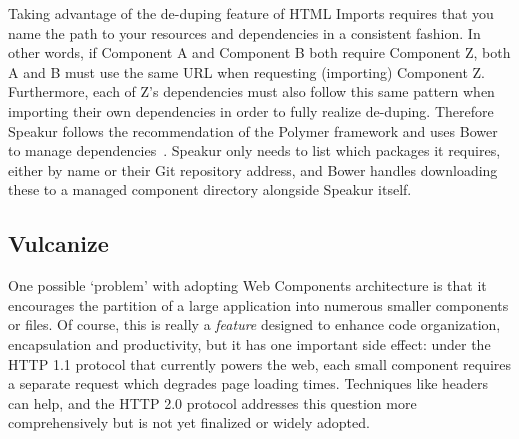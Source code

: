 Taking advantage of the de-duping feature of HTML Imports
requires that you name the path to your resources and dependencies in a consistent fashion.
In other words, if Component A and Component B both require Component Z, both A and B must use the same URL when requesting (importing) Component Z.
Furthermore, each of Z's dependencies must also follow this same pattern when importing their own dependencies in order to fully realize de-duping.
Therefore Speakur follows the recommendation of the Polymer framework and uses Bower to manage dependencies~\cite{bowercontributors2015}. 
Speakur only needs to list which packages it requires, either by name or their Git repository address, 
and Bower handles downloading these to a managed component directory alongside Speakur itself.

\subsection{Vulcanize}
One possible `problem' with adopting Web Components architecture is that it encourages the partition of a large application into numerous smaller components or files.
Of course, this is really a \textit{feature} designed to enhance code organization, encapsulation and productivity, 
but it has one important side effect: 
under the HTTP 1.1 protocol that currently powers the web, each small component requires a separate request which degrades page loading times.
Techniques like  headers can help, and the HTTP 2.0 protocol addresses this question more comprehensively but is not yet finalized or widely adopted.

